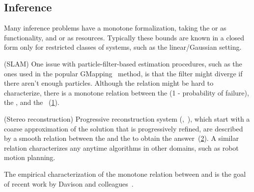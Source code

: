 \subsection{Inference}

Many inference problems have a monotone formalization, taking the
 or  as functionality, and 
or  as resources. Typically these bounds are known in
a closed form only for restricted classes of systems, such as the
linear/Gaussian setting.

\begin{example}
(SLAM)
  One issue with particle-filter-based estimation procedures,
  such as the ones used in the popular GMapping~\cite{grisetti07improved}
  method, is that the filter might diverge if there aren't enough particles.
  Although the relation might be hard to characterize, there is a monotone
  relation between the  (1 - probability of failure),
  the , and the ~(\cref{fig:gmapping}).
\end{example}

\begin{figure}[h]
  \centering
  \caption{\label{fig:gmapping} }
\end{figure}



\begin{example}
(Stereo reconstruction)
  Progressive reconstruction system (\eg ,~\cite{locher16progressive}),
  which start with a coarse approximation of the solution that is progressively
  refined, are described by a smooth relation between the 
  and the  to obtain the answer~(\cref{fig:progressive}).
  A similar relation characterizes any anytime algorithms in other domains,
  such as robot motion planning.
\end{example}


\begin{figure}[h]
  \centering
  \caption{\label{fig:progressive}}
\end{figure}


\begin{example}
  The empirical characterization of the monotone relation between  and 
  is the goal of recent work by Davison and colleagues~\cite{nardi15introducing,zia16comparative}.
\end{example}

